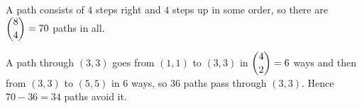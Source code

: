 A path consists of $4$ steps right and $4$ steps up in some order, so there are $\dbinom{8}{4}=70$ paths in all.

A path through $(3,3)$ goes from $(1,1)$ to $(3,3)$ in $\dbinom{4}{2}=6$ ways and then from $(3,3)$ to $(5,5)$ in $6$ ways, so $36$ paths pass through $(3,3)$. Hence $70-36=\boxed{34}$ paths avoid it.
